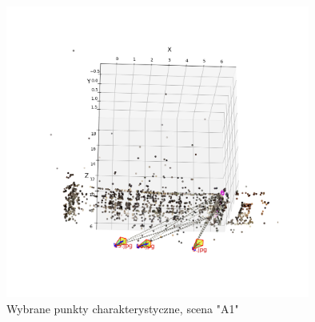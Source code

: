 \begin{figure}[h]
   \centering
   \includegraphics[width=10cm]{feature_A1/plot.png}
   \caption{Wybrane punkty charakterystyczne, scena "A1"}
   \label {fig:feature_A1_plot}
\end{figure}
